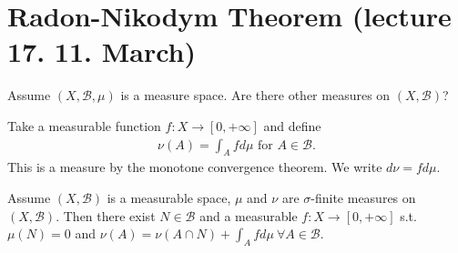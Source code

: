 \section{Radon-Nikodym Theorem (lecture 17. 11. March)}
Assume \((X,\mathscr{B}, \mu)\) is a measure space. Are there other measures on \((X,\mathscr{B})\)?
\begin{example}
    Take a measurable function \(f:X\rightarrow [0,+\infty]\) and define
    \begin{align*}
        \nu(A) = \int_A fd\mu \text{ for } A\in\mathscr{B}.
    \end{align*}
    This is a measure by the monotone convergence theorem. We write \(d\nu = fd\mu\).
\end{example}
\begin{proposition}
    Assume \((X,\mathscr{B})\) is a measurable space, \(\mu\) and \(\nu\) are \(\sigma\)-finite measures on \((X,\mathscr{B})\). Then there
    exist \(N\in\mathscr{B}\) and a measurable \(f:X\rightarrow[0,+\infty]\) s.t.
    \(\mu(N)=0\) and \(\nu(A)=\nu(A\cap N) + \int_A fd\mu \ \forall A\in\mathscr{B}\). 
\end{proposition}
\ifdetailed 
